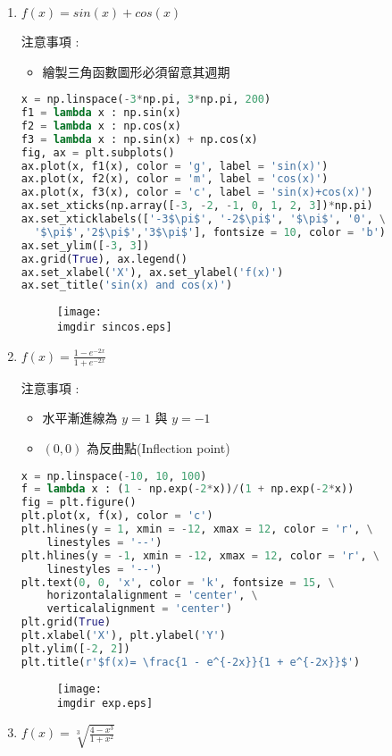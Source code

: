 \begin{enumerate}
\item
$f(x) = sin(x) + cos(x)$

注意事項 : 
\begin{itemize}
\item
繪製三角函數圖形必須留意其週期
\end{itemize}
\bigskip
\begin{lstlisting}[language = Python]
x = np.linspace(-3*np.pi, 3*np.pi, 200)
f1 = lambda x : np.sin(x)
f2 = lambda x : np.cos(x)
f3 = lambda x : np.sin(x) + np.cos(x)
fig, ax = plt.subplots()
ax.plot(x, f1(x), color = 'g', label = 'sin(x)')
ax.plot(x, f2(x), color = 'm', label = 'cos(x)')
ax.plot(x, f3(x), color = 'c', label = 'sin(x)+cos(x)')
ax.set_xticks(np.array([-3, -2, -1, 0, 1, 2, 3])*np.pi)
ax.set_xticklabels(['-3$\pi$', '-2$\pi$', '$\pi$', '0', \
  '$\pi$','2$\pi$','3$\pi$'], fontsize = 10, color = 'b')
ax.set_ylim([-3, 3])
ax.grid(True), ax.legend()
ax.set_xlabel('X'), ax.set_ylabel('f(x)')
ax.set_title('sin(x) and cos(x)')
\end{lstlisting}
\begin{figure}[H]
    \centering
        \texttt{[image: \\imgdir sincos.eps]}
\end{figure}

\item
$\displaystyle f(x) = \frac{1-e^{-2x}}{1+e^{-2x}}$
\vspace{0.2cm}

注意事項 :
\begin{itemize}
\item
水平漸進線為 $y = 1$ 與 $y = -1$
\item
$(0, 0)$ 為反曲點(Inflection point)
\end{itemize}
\bigskip
\begin{lstlisting}[language = Python]
x = np.linspace(-10, 10, 100)
f = lambda x : (1 - np.exp(-2*x))/(1 + np.exp(-2*x))
fig = plt.figure()
plt.plot(x, f(x), color = 'c')
plt.hlines(y = 1, xmin = -12, xmax = 12, color = 'r', \
	linestyles = '--')
plt.hlines(y = -1, xmin = -12, xmax = 12, color = 'r', \
	linestyles = '--')
plt.text(0, 0, 'x', color = 'k', fontsize = 15, \
 	horizontalalignment = 'center', \
 	verticalalignment = 'center')
plt.grid(True)
plt.xlabel('X'), plt.ylabel('Y')
plt.ylim([-2, 2])
plt.title(r'$f(x)= \frac{1 - e^{-2x}}{1 + e^{-2x}}$')
\end{lstlisting}
\begin{figure}[H]
    \centering
        \texttt{[image: \\imgdir exp.eps]}
\end{figure}
\item
$\displaystyle f(x) = \sqrt[3]{\frac{4-x^3}{1+x^2}}$
\vspace{0.2cm}


\end{enumerate}
